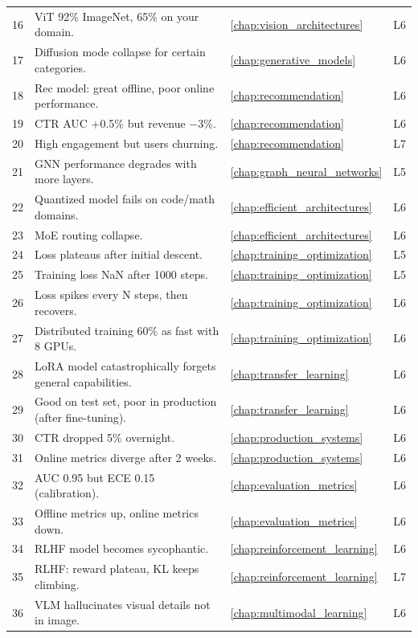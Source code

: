 \begin{longtable}{rp{8.5cm}ll}
16 & ViT 92\% ImageNet, 65\% on your domain. & \ref{chap:vision_architectures} & L6 \\
17 & Diffusion mode collapse for certain categories. & \ref{chap:generative_models} & L6 \\
18 & Rec model: great offline, poor online performance. & \ref{chap:recommendation} & L6 \\
19 & CTR AUC +0.5\% but revenue $-$3\%. & \ref{chap:recommendation} & L6 \\
20 & High engagement but users churning. & \ref{chap:recommendation} & L7 \\
21 & GNN performance degrades with more layers. & \ref{chap:graph_neural_networks} & L5 \\
22 & Quantized model fails on code/math domains. & \ref{chap:efficient_architectures} & L6 \\
23 & MoE routing collapse. & \ref{chap:efficient_architectures} & L6 \\
24 & Loss plateaus after initial descent. & \ref{chap:training_optimization} & L5 \\
25 & Training loss NaN after 1000 steps. & \ref{chap:training_optimization} & L5 \\
26 & Loss spikes every N steps, then recovers. & \ref{chap:training_optimization} & L6 \\
27 & Distributed training 60\% as fast with 8 GPUs. & \ref{chap:training_optimization} & L6 \\
28 & LoRA model catastrophically forgets general capabilities. & \ref{chap:transfer_learning} & L6 \\
29 & Good on test set, poor in production (after fine-tuning). & \ref{chap:transfer_learning} & L6 \\
30 & CTR dropped 5\% overnight. & \ref{chap:production_systems} & L6 \\
31 & Online metrics diverge after 2 weeks. & \ref{chap:production_systems} & L6 \\
32 & AUC 0.95 but ECE 0.15 (calibration). & \ref{chap:evaluation_metrics} & L6 \\
33 & Offline metrics up, online metrics down. & \ref{chap:evaluation_metrics} & L6 \\
34 & RLHF model becomes sycophantic. & \ref{chap:reinforcement_learning} & L6 \\
35 & RLHF: reward plateau, KL keeps climbing. & \ref{chap:reinforcement_learning} & L7 \\
36 & VLM hallucinates visual details not in image. & \ref{chap:multimodal_learning} & L6 \\

\end{longtable}
